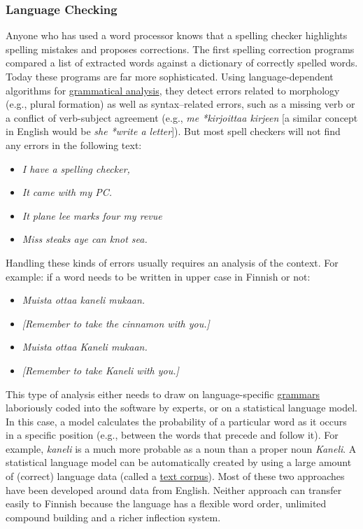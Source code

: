 \documentclass[]{../../metanetpaper}
\begin{document}
\begin{multicols}{2}
\subsubsection{Language Checking}


Anyone who has used a word processor knows that a spelling checker highlights 
spelling mistakes and proposes corrections.  The first spelling correction programs compared
a list of extracted words against a dictionary of correctly spelled
words. Today these programs are far more sophisticated. Using
language-dependent algorithms for \underline{grammatical analysis},
they detect errors
related to morphology (e.g., plural formation) as well as
syntax–related errors, such as a missing verb or a conflict of
verb-subject agreement (e.g.,
\textit{\foreignlanguage{finnish}{\textit{me *kirjoittaa kirjeen}}}
 [a similar concept in English would be
\textit{she *write a letter}]).
But most spell checkers will not find any errors in the
following text:
\begin{itemize} %
\item[] \textit{I have a spelling checker,}

\item[] \textit{It came with my PC.}

\item[] \textit{It plane lee marks four my revue}

\item[] \textit{Miss steaks aye can knot sea.} \cite{Surprise}
\end{itemize}
Handling these kinds of errors usually requires an analysis of the
context. For example: if a word needs to be written in upper case in
Finnish or not:
\begin{itemize}
\item[] {\foreignlanguage{finnish}{\textit{Muista ottaa kaneli mukaan.}}} 
\item   {\textit{[Remember to take the cinnamon with you.]}}
\item[] {\foreignlanguage{finnish}{\textit{Muista ottaa Kaneli mukaan.}}}
\item   {\textit{[Remember to take Kaneli with you.]} }
\end{itemize}
This type of analysis either needs to draw on language-specific
\underline{grammars} laboriously coded into the software by experts, or on a
statistical language model. In this case, a model calculates the
probability of a particular word as it occurs in a specific position
(e.g., between the words that precede and follow it). For example,
 {\foreignlanguage{finnish}{\textit{kaneli}}} is a much more probable
 as a noun than a proper noun
 {\foreignlanguage{finnish}{\textit{Kaneli}}}.
A statistical language model can be automatically created by using a
large amount of (correct) language data (called a \underline{text corpus}).
Most
of these two approaches have been developed around data from
English. Neither approach can transfer easily to Finnish because the
language has a flexible word order, unlimited compound building and a
richer inflection system.


\end{multicols}
\end{document}
